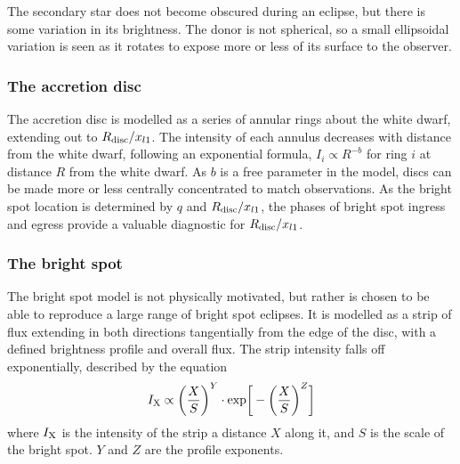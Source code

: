 The secondary star does not become obscured during an eclipse, but there is some variation in its brightness. The donor is not spherical, so a small ellipsoidal variation is seen as it rotates to expose more or less of its surface to the observer.

\subsubsection{The accretion disc}

The accretion disc is modelled as a series of annular rings about the white dwarf, extending out to $R_{\rm disc} / x_{l1}$. The intensity of each annulus decreases with distance from the white dwarf, following an exponential formula, $I_i \propto R^{-b}$ for ring $i$ at distance $R$ from the white dwarf. As $b$ is a free parameter in the model, discs can be made more or less centrally concentrated to match observations. As the bright spot location is determined by $q$ and $R_{\rm disc} / x_{l1}$, the phases of bright spot ingress and egress provide a valuable diagnostic for $R_{\rm disc} / x_{l1}$.

\subsubsection{The bright spot}

The bright spot model is not physically motivated, but rather is chosen to be able to reproduce a large range of bright spot eclipses.
It is modelled as a strip of flux extending in both directions tangentially from the edge of the disc, with a defined brightness profile and overall flux. The strip intensity falls off exponentially, described by the equation
\begin{equation}
    I_{\rm X} \propto \bigg ( \frac{X}{S} \bigg )^Y \cdot {\rm exp} \bigg [ - \bigg (\frac{X}{S} \bigg )^Z \bigg]
\end{equation}
where $I_{\rm X}$ is the intensity of the strip a distance $X$ along it, and $S$ is the scale of the bright spot. $Y$ and $Z$ are the profile exponents.

